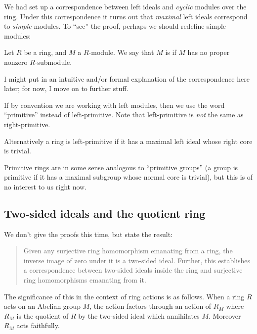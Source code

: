\documentclass[a4paper]{amsart}
\begin{document}
We had set up a correspondence between left ideals and {\em cyclic}
modules over the ring. Under this correspondence it turns out that
{\em maximal} left ideals correspond to {\em simple} modules. To
``see'' the proof, perhaps we should redefine simple modules:

\begin{altdefiner}
  Let $R$ be a ring, and $M$ a $R$-module. We say that $M$ is
   if $M$ has no proper nonzero
  $R$-submodule.
\end{altdefiner}

I might put in an intuitive and/or formal explanation of the
correspondence here later; for now, I move on to further stuff.

\begin{definer}
   If by convention we are working with left modules, then we
  use the word ``primitive'' instead of left-primitive. Note that
  left-primitive is {\em not} the same as right-primitive.

  Alternatively a ring is left-primitive if it has a maximal left
  ideal whose right core is trivial.
\end{definer}

Primitive rings are in some sense analogous to ``primitive groups'' (a
group is primitive if it has a maximal subgroup whose normal core is
trivial), but this is of no interest to us right now.

\subsection{Two-sided ideals and the quotient ring}

We don't give the proofs this time, but state the result:

\begin{quote}
  Given any surjective ring homomorphism emanating from a ring, the
  inverse image of zero under it is a two-sided ideal. Further, this
  establishes a correspondence between two-sided ideals inside the
  ring and surjective ring homomorphisms emanating from it.
\end{quote}

The significance of this in the context of ring actions is as
follows. When a ring $R$ acts on an Abelian group $M$, the action
factors through an action of $R_M$ where $R_M$ is the quotient of $R$
by the two-sided ideal which annihilates $M$. Moreover $R_M$ acts
faithfully.
\end{document}
